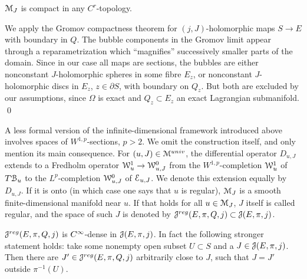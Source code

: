 \documentclass[10pt,letterpaper]{article}
\begin{document}
\begin{lemma} \label{th:compactness}
$\mathcal{M}_J$ is compact in any $C^r$-topology.
\end{lemma}

\proof We apply the Gromov compactness theorem for $(j,J)$-holomorphic maps $S
\rightarrow E$ with boundary in $Q$. The bubble components in the Gromov limit
appear through a reparametrization which ``magnifies'' successively smaller
parts of the domain. Since in our case all maps are sections, the bubbles are
either nonconstant $J$-holomorphic spheres in some fibre $E_z$, or nonconstant
$J$-holomorphic discs in $E_z$, $z \in \partial S$, with boundary on $Q_z$. But
both are excluded by our assumptions, since $\Omega$ is exact and $Q_z \subset
E_z$ an exact Lagrangian submanifold. \qed

A less formal version of the infinite-dimen\-sional framework introduced above
involves spaces of $W^{1,p}$-sections, $p>2$. We omit the construction itself,
and only mention its main consequence. For $(u,J) \in \mathcal{M}^{univ}$, the
differential operator $D_{u,J}$ extends to a Fredholm operator $\mathcal{W}^1_u
\rightarrow \mathcal{W}^0_{u,J}$ from the $W^{1,p}$-completion $\mathcal{W}^1_u$ of $T\mathcal{B}_u$ to
the $L^p$-completion $\mathcal{W}^0_{u,J}$ of $\mathcal{E}_{u,J}$. We denote this extension
equally by $D_{u,J}$. If it is onto (in which case one says that $u$ is
regular), $\mathcal{M}_J$ is a smooth finite-dimensional manifold near $u$. If that
holds for all $u \in \mathcal{M}_J$, $J$ itself is called regular, and the space of
such $J$ is denoted by $\mathcal{J}^{reg}(E,\pi,Q,j) \subset \mathcal{J}(E,\pi,j)$.

\begin{lemma} \label{th:transversality}
$\mathcal{J}^{reg}(E,\pi,Q,j)$ is $C^\infty$-dense in $\mathcal{J}(E,\pi,j)$. In fact the
following stronger statement holds: take some nonempty open subset $U \subset
S$ and a $J \in \mathcal{J}(E,\pi,j)$. Then there are $J' \in \mathcal{J}^{reg}(E,\pi,Q,j)$
arbitrarily close to $J$, such that $J = J'$ outside $\pi^{-1}(U)$.
\end{lemma}
\end{document}
